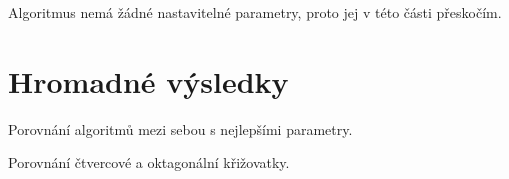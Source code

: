 Algoritmus  nemá žádné nastavitelné parametry, proto jej v této části přeskočím.

%



%
%
%
%



\section{Hromadné výsledky}\label{sec:hromadne_vysledky}

Porovnání algoritmů mezi sebou s nejlepšími parametry.

Porovnání čtvercové a oktagonální křižovatky.



